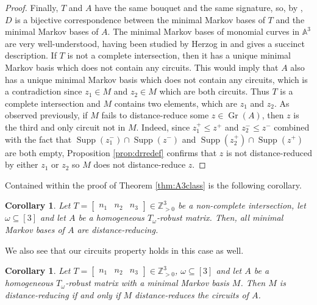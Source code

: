 \documentclass[a4paper, 12pt]{article}
\newcommand{\ZZ}{\mathbb Z}
\theoremstyle{plain}
\newtheorem{corollary}[theorem]{Corollary}
\theoremstyle{definition}
\theoremstyle{remark}
\begin{document}
\begin{proof}
    Finally, $T$ and $A$ have the same bouquet and the same signature, so, by \cite[Theorem 2.2]{kosta2023strongly}, $D$ is a bijective correspondence between the minimal Markov bases of $T$ and the minimal Markov bases of $A$. The minimal Markov bases of monomial curves in $\mathbb{A}^3$ are very well-understood, having been studied by Herzog in \cite{Herzog1970} and \cite[Theorem 3.2]{CK_2024} gives a succinct description. If $T$ is not a complete intersection, then it has a unique minimal Markov basis which does not contain any circuits. This would imply that $A$ also has a unique minimal Markov basis which does not contain any circuits, which is a contradiction since $z_1 \in M$ and $z_2 \in M$ which are both circuits. Thus $T$ is a complete intersection and $M$ contains two elements, which are $z_1$ and $z_2$. As observed previously, if $M$ fails to distance-reduce some $z \in \operatorname{Gr}(A)$, then $z$ is the third and only circuit not in $M$. Indeed, since $z_1^+ \le z^+$ and $z_2^- \le z^-$ combined with the fact that $\operatorname{Supp}(z_1^-) \cap \operatorname{Supp}(z^-)$ and $\operatorname{Supp}(z_2^+) \cap \operatorname{Supp}(z^+)$ are both empty, Proposition \ref{prop:drredef} confirms that $z$ is not distance-reduced by either $z_1$ or $z_2$ so $M$ does not distance-reduce $z$.
\end{proof}

Contained within the proof of Theorem \ref{thm:A3class} is the following corollary.

\begin{corollary}
     Let $T=\begin{bmatrix}
        n_1 & n_2 & n_3
    \end{bmatrix} \in \ZZ_{>0}^3$ be a non-complete intersection, let $\omega \subseteq [3]$ and let $A$ be a homogeneous $T_{\omega}$-robust matrix. Then, all minimal Markov bases of $A$ are distance-reducing.
\end{corollary}

We also see that our circuits property holds in this case as well.

\begin{corollary}
     Let $T=\begin{bmatrix}
        n_1 & n_2 & n_3
    \end{bmatrix} \in \ZZ_{>0}^3$, $\omega \subseteq [3]$ and let $A$ be a homogeneous $T_{\omega}$-robust matrix with a minimal Markov basis $M$. Then $M$ is distance-reducing if and only if $M$ distance-reduces the circuits of $A$.
\end{corollary}
\end{document}
